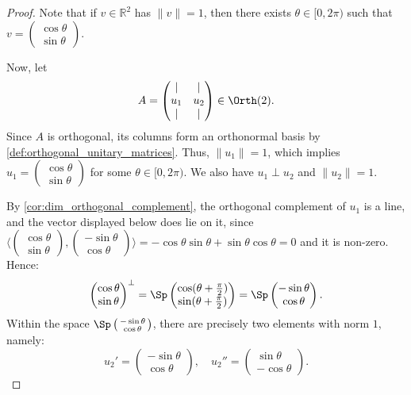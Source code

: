 \begin{proof}
Note that if $v \in \mathbb{R}^2$ has $\|v\| = 1$, then there exists $\theta \in [0, 2\pi)$ such that $v = \left(\begin{smallmatrix} \cos\theta \\ \sin\theta \end{smallmatrix}\right)$.

Now, let
\[
    A = \begin{pmatrix} | & | \\ u_1 & u_2 \\ | & | \end{pmatrix} \in \Orth(2).
\]
Since $A$ is orthogonal, its columns form an orthonormal basis by \cref{def:orthogonal_unitary_matrices}. Thus, $\|u_1\| = 1$, which implies $u_1 = \left(\begin{smallmatrix} \cos\theta \\ \sin\theta \end{smallmatrix}\right)$ for some $\theta \in [0, 2\pi)$. 
We also have $u_1 \perp u_2$ and $\|u_2\| = 1$. 

By \cref{cor:dim_orthogonal_complement}, the orthogonal complement of $u_1$ is a line, and the vector displayed below does lie on it, since $\langle \left(\begin{smallmatrix} \cos\theta \\ \sin\theta \end{smallmatrix}\right), \left(\begin{smallmatrix} -\sin\theta \\ \cos\theta \end{smallmatrix}\right) \rangle = -\cos\theta\sin\theta + \sin\theta\cos\theta = 0$ and it is non-zero. Hence:
\[ \begin{pmatrix} \cos\theta \\ \sin\theta \end{pmatrix}^\perp = \Sp \begin{pmatrix} \cos(\theta + \frac{\pi}{2}) \\ \sin(\theta + \frac{\pi}{2}) \end{pmatrix} = \Sp \begin{pmatrix} -\sin\theta \\ \cos\theta \end{pmatrix}. \]
Within the space $\Sp\left(\begin{smallmatrix} -\sin\theta \\ \cos\theta \end{smallmatrix}\right)$, there are precisely two elements with norm $1$, namely:
\[ u_2' = \begin{pmatrix} -\sin\theta \\ \cos\theta \end{pmatrix}, \quad u_2'' = \begin{pmatrix} \sin\theta \\ -\cos\theta \end{pmatrix}. \]


\end{proof}
